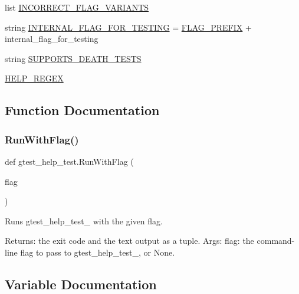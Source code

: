 \begin{DoxyCompactItemize}
\item 
list \mbox{\hyperlink{namespacegtest__help__test_a6f677b9f975f09db7604a5ee9c4821a3}{I\+N\+C\+O\+R\+R\+E\+C\+T\+\_\+\+F\+L\+A\+G\+\_\+\+V\+A\+R\+I\+A\+N\+TS}}
\item 
string \mbox{\hyperlink{namespacegtest__help__test_aa7f487cde98f691eecc5f1f5e67c0a69}{I\+N\+T\+E\+R\+N\+A\+L\+\_\+\+F\+L\+A\+G\+\_\+\+F\+O\+R\+\_\+\+T\+E\+S\+T\+I\+NG}} = \mbox{\hyperlink{namespacegtest__help__test_a9e357a76dd993057c826ec411c9a4b3c}{F\+L\+A\+G\+\_\+\+P\+R\+E\+F\+IX}} + \textquotesingle{}internal\+\_\+flag\+\_\+for\+\_\+testing\textquotesingle{}
\item 
string \mbox{\hyperlink{namespacegtest__help__test_a70c7e8b24ce75dfa26ff540b861cdc54}{S\+U\+P\+P\+O\+R\+T\+S\+\_\+\+D\+E\+A\+T\+H\+\_\+\+T\+E\+S\+TS}}
\item 
\mbox{\hyperlink{namespacegtest__help__test_acaee97106f5b6ad6de66778688d4b906}{H\+E\+L\+P\+\_\+\+R\+E\+G\+EX}}
\end{DoxyCompactItemize}


\subsection{Function Documentation}
\mbox{\label{namespacegtest__help__test_a3d369750dac11a6dca523139fe1e6c86}} 
\subsubsection{\texorpdfstring{RunWithFlag()}{RunWithFlag()}}
{\footnotesize\ttfamily def gtest\+\_\+help\+\_\+test.\+Run\+With\+Flag (\begin{DoxyParamCaption}\item[{}]{flag }\end{DoxyParamCaption})}

\begin{DoxyVerb}Runs gtest_help_test_ with the given flag.

Returns:
  the exit code and the text output as a tuple.
Args:
  flag: the command-line flag to pass to gtest_help_test_, or None.
\end{DoxyVerb}
 

\subsection{Variable Documentation}
\mbox{\label{namespacegtest__help__test_a322bbb8bf27d7701c76fb5704a1fda1f}} 
